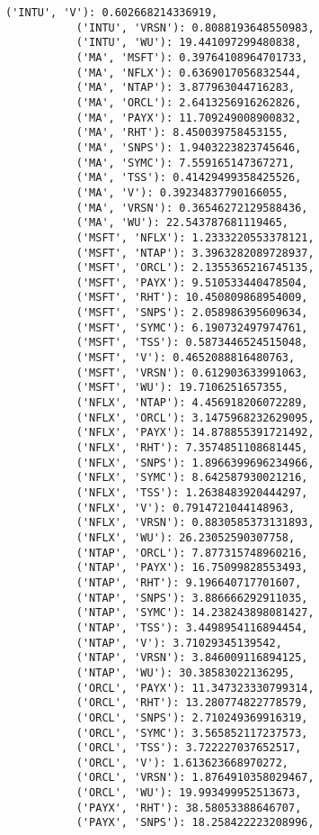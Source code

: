 \documentclass[11pt]{article}
\begin{document}
\begin{Verbatim}[commandchars=\\\{\}]
           ('INTU', 'V'): 0.602668214336919,
           ('INTU', 'VRSN'): 0.8088193648550983,
           ('INTU', 'WU'): 19.441097299480838,
           ('MA', 'MSFT'): 0.39764108964701733,
           ('MA', 'NFLX'): 0.6369017056832544,
           ('MA', 'NTAP'): 3.877963044716283,
           ('MA', 'ORCL'): 2.6413256916262826,
           ('MA', 'PAYX'): 11.709249008900832,
           ('MA', 'RHT'): 8.450039758453155,
           ('MA', 'SNPS'): 1.9403223823745646,
           ('MA', 'SYMC'): 7.559165147367271,
           ('MA', 'TSS'): 0.41429499358425526,
           ('MA', 'V'): 0.39234837790166055,
           ('MA', 'VRSN'): 0.36546272129588436,
           ('MA', 'WU'): 22.543787681119465,
           ('MSFT', 'NFLX'): 1.2333220553378121,
           ('MSFT', 'NTAP'): 3.3963282089728937,
           ('MSFT', 'ORCL'): 2.1355365216745135,
           ('MSFT', 'PAYX'): 9.510533440478504,
           ('MSFT', 'RHT'): 10.450809868954009,
           ('MSFT', 'SNPS'): 2.058986395609634,
           ('MSFT', 'SYMC'): 6.190732497974761,
           ('MSFT', 'TSS'): 0.5873446524515048,
           ('MSFT', 'V'): 0.4652088816480763,
           ('MSFT', 'VRSN'): 0.612903633991063,
           ('MSFT', 'WU'): 19.7106251657355,
           ('NFLX', 'NTAP'): 4.456918206072289,
           ('NFLX', 'ORCL'): 3.1475968232629095,
           ('NFLX', 'PAYX'): 14.878855391721492,
           ('NFLX', 'RHT'): 7.3574851108681445,
           ('NFLX', 'SNPS'): 1.8966399696234966,
           ('NFLX', 'SYMC'): 8.642587930021216,
           ('NFLX', 'TSS'): 1.2638483920444297,
           ('NFLX', 'V'): 0.7914721044148963,
           ('NFLX', 'VRSN'): 0.8830585373131893,
           ('NFLX', 'WU'): 26.23052590307758,
           ('NTAP', 'ORCL'): 7.877315748960216,
           ('NTAP', 'PAYX'): 16.75099828553493,
           ('NTAP', 'RHT'): 9.196640717701607,
           ('NTAP', 'SNPS'): 3.886666292911035,
           ('NTAP', 'SYMC'): 14.238243898081427,
           ('NTAP', 'TSS'): 3.4498954116894454,
           ('NTAP', 'V'): 3.71029345139542,
           ('NTAP', 'VRSN'): 3.846009116894125,
           ('NTAP', 'WU'): 30.38583022136295,
           ('ORCL', 'PAYX'): 11.347323330799314,
           ('ORCL', 'RHT'): 13.280774822778579,
           ('ORCL', 'SNPS'): 2.710249369916319,
           ('ORCL', 'SYMC'): 3.565852117237573,
           ('ORCL', 'TSS'): 3.722227037652517,
           ('ORCL', 'V'): 1.613623668970272,
           ('ORCL', 'VRSN'): 1.8764910358029467,
           ('ORCL', 'WU'): 19.993499952513673,
           ('PAYX', 'RHT'): 38.58053388646707,
           ('PAYX', 'SNPS'): 18.258422223208996,

\end{Verbatim}
\end{document}
